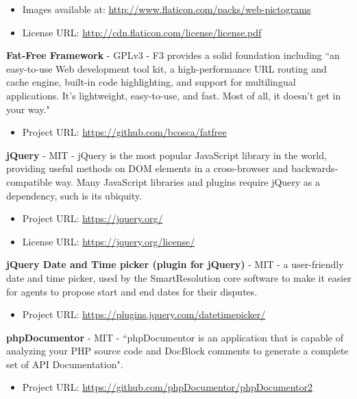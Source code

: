 \begin{itemize}
\item Images available at: \url{http://www.flaticon.com/packs/web-pictograms}
\item License URL: \url{http://cdn.flaticon.com/license/license.pdf}
\end{itemize}

\textbf{Fat-Free Framework} - GPLv3 - F3 provides a solid foundation including ``an easy-to-use Web development tool kit, a high-performance URL routing and cache engine, built-in code highlighting, and support for multilingual applications. It's lightweight, easy-to-use, and fast. Most of all, it doesn't get in your way."

\begin{itemize}
\item Project URL: \url{https://github.com/bcosca/fatfree}
\end{itemize}

\textbf{jQuery} - MIT - jQuery is the most popular JavaScript library in the world, providing useful methods on DOM elements in a cross-browser and backwards-compatible way. Many JavaScript libraries and plugins require jQuery as a dependency, such is its ubiquity.

\begin{itemize}
\item Project URL: \url{https://jquery.org/}
\item License URL: \url{https://jquery.org/license/}
\end{itemize}

\textbf{jQuery Date and Time picker (plugin for jQuery)} - MIT - a user-friendly date and time picker, used by the SmartResolution core software to make it easier for agents to propose start and end dates for their disputes.

\begin{itemize}
\item Project URL: \url{https://plugins.jquery.com/datetimepicker/}
\end{itemize}

\textbf{phpDocumentor} - MIT - ``phpDocumentor is an application that is capable of analyzing your PHP source code and DocBlock comments to generate a complete set of API Documentation".

\begin{itemize}
\item Project URL: \url{https://github.com/phpDocumentor/phpDocumentor2}
\end{itemize}

